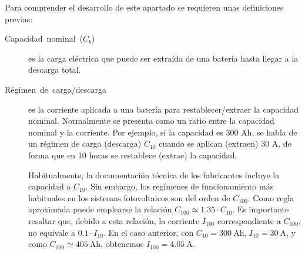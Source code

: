 Para comprender el desarrollo de este apartado se requieren unas definiciones
previas:
\begin{description}
\item [{Capacidad~nominal~($C_{b}$)}] es la carga eléctrica que puede
ser extraída de una batería hasta llegar a la descarga total.  
\item [{Régimen~de~carga/descarga}] es la corriente aplicada a una batería
para restablecer/extraer la capacidad nominal. Normalmente se presenta
como un ratio entre la capacidad nominal y la corriente. Por ejemplo,
si la capacidad es 300 Ah, se habla de un régimen de carga (descarga)
$C_{10}$ cuando se aplican (extraen) 30 A, de forma que en 10 horas
se restablece (extrae) la capacidad. 

Habitualmente, la documentación técnica de los fabricantes incluye la
capacidad a $C_{10}$. Sin embargo, los regímenes de funcionamiento más
habituales en los sistemas fotovoltaicos son del orden de
$C_{100}$. Como regla aproximada puede emplearse la relación $C_{100}
\simeq 1.35 \cdot C_{10}$. Es importante resaltar que, debido a esta relación, la corriente $I_{100}$
correspondiente a $C_{100}$, no equivale a $0.1 \cdot I_{10}$. En el
caso anterior, con $C_{10}=\SI{300}{\ampere\hour}$,
$I_{10}=\SI{30}{\ampere}$, y como $C_{100}\simeq
\SI{405}{\ampere\hour}$, obtenemos $I_{100}=\SI{4.05}{\ampere}$.


\end{description}

